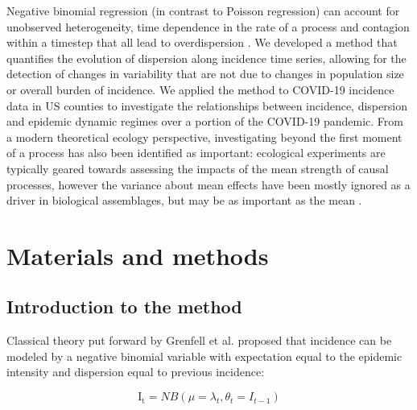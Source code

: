 \documentclass[10pt,letterpaper]{article}
\begin{document}
Negative binomial regression (in contrast to Poisson regression) can account for unobserved heterogeneity, time dependence in the rate of a process and contagion within a timestep that all lead to overdispersion \cite{barron_analysis_1992}.
We developed a method that quantifies the evolution of dispersion along incidence time series, allowing for the detection of changes in variability that are not due to changes in population size or overall burden of incidence.
We applied the method to COVID-19 incidence data in US counties to investigate the relationships between incidence, dispersion and epidemic dynamic regimes over a portion of the COVID-19 pandemic. 
From a modern theoretical ecology perspective, investigating beyond the first moment of a process has also been identified as important: ecological experiments are typically geared towards assessing the impacts of the mean strength of causal processes, however the variance about mean effects have been mostly ignored as a driver in biological assemblages, but may be as important as the mean \cite{benedetti-cecchi_importance_2003}.

\section*{Materials and methods}
\subsection*{Introduction to the method}

Classical theory put forward by Grenfell et al. \cite{grenfell_dynamics_2002} proposed that incidence can be modeled by a negative binomial variable with expectation equal to the epidemic intensity and dispersion equal to previous incidence:

\begin{equation}
    \mathrm{I_t} = NB(\mu = \lambda_t, \theta_t = I_{t-1})
\end{equation}
\end{document}
